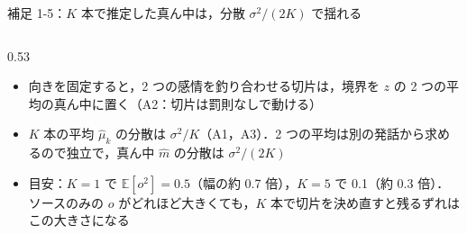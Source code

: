 \begin{frame}{補足 1-5：$K$ 本で推定した真ん中は，分散 $\sigma^2/(2K)$ で揺れる}
\begin{columns}[T,onlytextwidth]
\begin{column}{0.53\textwidth}
\begin{itemize}
        \item 向きを固定すると，2 つの感情を釣り合わせる切片は，境界を $z$ の 2 つの平均の真ん中に置く（A2：切片は罰則なしで動ける）
        \item $K$ 本の平均 $\hat\mu_k$ の分散は $\sigma^2/K$（A1，A3）．2 つの平均は別の発話から求めるので独立で，真ん中 $\hat m$ の分散は $\sigma^2/(2K)$
        \item 目安：$K=1$ で $\mathbb{E}[o^2]=0.5$（幅の約 0.7 倍），$K=5$ で 0.1（約 0.3 倍）．ソースのみの $o$ がどれほど大きくても，$K$ 本で切片を決め直すと残るずれはこの大きさになる
      \end{itemize}
    \end{column}
  \end{columns}
\end{frame}

